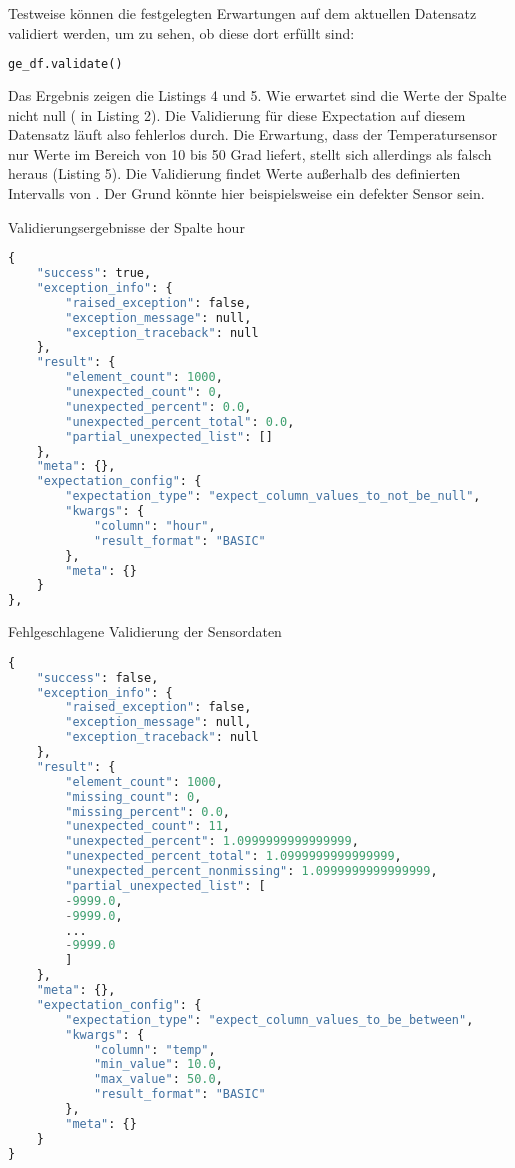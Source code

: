 Testweise können die festgelegten Erwartungen auf dem aktuellen Datensatz validiert werden, um zu sehen, ob diese dort erfüllt sind:

\begin{lstlisting}[language=Python]
ge_df.validate()
\end{lstlisting}
	
Das Ergebnis zeigen die Listings 4 und 5. Wie erwartet sind die Werte der Spalte  nicht null ( in Listing 2). Die Validierung für diese Expectation auf  diesem Datensatz läuft also fehlerlos durch. Die Erwartung, dass der Temperatursensor nur Werte im Bereich   von 10 bis 50 Grad liefert, stellt sich allerdings als falsch heraus (Listing 5). Die Validierung findet
    Werte außerhalb des definierten Intervalls von . Der Grund könnte hier beispielsweise
     ein defekter Sensor sein.
 


\begin{code}
  \caption{Validierungsergebnisse der Spalte hour}
\begin{lstlisting}[language=Python]
{
	"success": true,
	"exception_info": {
		"raised_exception": false,
		"exception_message": null,
		"exception_traceback": null
	},
	"result": {
		"element_count": 1000,
		"unexpected_count": 0,
		"unexpected_percent": 0.0,
		"unexpected_percent_total": 0.0,
		"partial_unexpected_list": []
	},
	"meta": {},
	"expectation_config": {
		"expectation_type": "expect_column_values_to_not_be_null",
		"kwargs": {
			"column": "hour",
			"result_format": "BASIC"
		},
		"meta": {}
	}
},
\end{lstlisting}
\end{code}
	
\begin{code}
  \caption{Fehlgeschlagene Validierung der Sensordaten}
	
\begin{lstlisting}[language=Python]
{
	"success": false,
	"exception_info": {
		"raised_exception": false,
		"exception_message": null,
		"exception_traceback": null
	},
	"result": {
		"element_count": 1000,
		"missing_count": 0,
		"missing_percent": 0.0,
		"unexpected_count": 11,
		"unexpected_percent": 1.0999999999999999,
		"unexpected_percent_total": 1.0999999999999999,
		"unexpected_percent_nonmissing": 1.0999999999999999,
		"partial_unexpected_list": [
		-9999.0,
		-9999.0,
		...
		-9999.0
		]
	},
	"meta": {},
	"expectation_config": {
		"expectation_type": "expect_column_values_to_be_between",
		"kwargs": {
			"column": "temp",
			"min_value": 10.0,
			"max_value": 50.0,
			"result_format": "BASIC"
		},
		"meta": {}
	}
}
\end{lstlisting}
\end{code}
	
